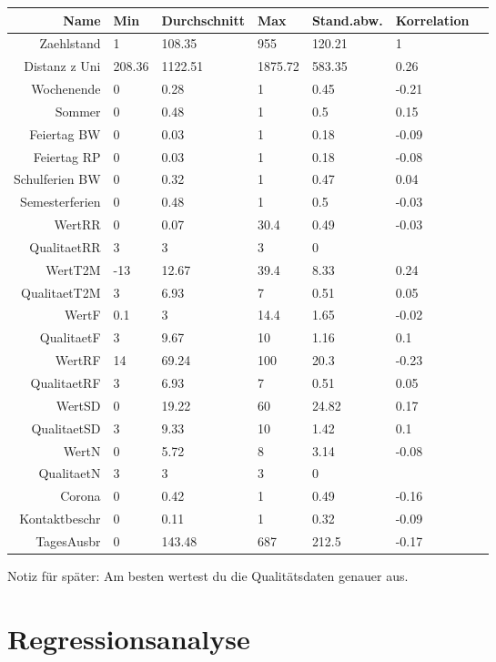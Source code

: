 \documentclass[a4paper,12pt]{thesis}
\begin{document}
\begin{table}[ht]
	\centering
	\begin{tabular}{rllllll}
		\hline
		Name & Min & Durchschnitt & Max & Stand.abw. & Korrelation \\ 
		\hline
		Zaehlstand & 1 & 108.35 & 955 & 120.21 & 1 \\ 
		Distanz z Uni & 208.36 & 1122.51 & 1875.72 & 583.35 & 0.26 \\ 
		Wochenende & 0 & 0.28 & 1 & 0.45 & -0.21 \\ 
		Sommer & 0 & 0.48 & 1 & 0.5 & 0.15 \\ 
		Feiertag BW & 0 & 0.03 & 1 & 0.18 & -0.09 \\ 
		Feiertag RP & 0 & 0.03 & 1 & 0.18 & -0.08 \\ 
		Schulferien BW & 0 & 0.32 & 1 & 0.47 & 0.04 \\ 
		Semesterferien & 0 & 0.48 & 1 & 0.5 & -0.03 \\ 
		WertRR & 0 & 0.07 & 30.4 & 0.49 & -0.03 \\ 
		QualitaetRR & 3 & 3 & 3 & 0 &  \\ 
		WertT2M & -13 & 12.67 & 39.4 & 8.33 & 0.24 \\ 
		QualitaetT2M & 3 & 6.93 & 7 & 0.51 & 0.05 \\ 
		WertF & 0.1 & 3 & 14.4 & 1.65 & -0.02 \\ 
		QualitaetF & 3 & 9.67 & 10 & 1.16 & 0.1 \\ 
		WertRF & 14 & 69.24 & 100 & 20.3 & -0.23 \\ 
		QualitaetRF & 3 & 6.93 & 7 & 0.51 & 0.05 \\ 
		WertSD & 0 & 19.22 & 60 & 24.82 & 0.17 \\ 
		QualitaetSD & 3 & 9.33 & 10 & 1.42 & 0.1 \\ 
		WertN & 0 & 5.72 & 8 & 3.14 & -0.08 \\ 
		QualitaetN & 3 & 3 & 3 & 0 &  \\ 
		Corona & 0 & 0.42 & 1 & 0.49 & -0.16 \\ 
		Kontaktbeschr & 0 & 0.11 & 1 & 0.32 & -0.09 \\ 
		TagesAusbr & 0 & 143.48 & 687 & 212.5 & -0.17 \\ 
		\hline
	\end{tabular}
\end{table}

Notiz für später: Am besten wertest du die Qualitätsdaten genauer aus.


\section{Regressionsanalyse}
\end{document}
